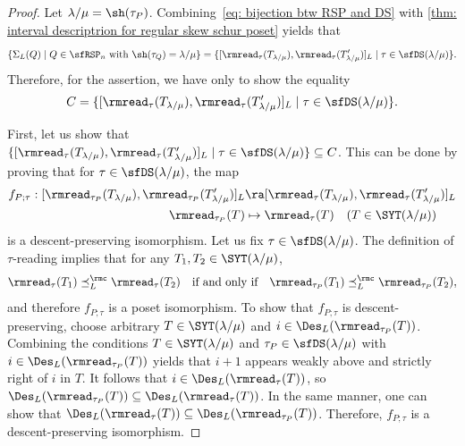 \documentclass[12pt, reqno]{amsart}
\theoremstyle{definition}
\numberwithin{equation}{section} \numberwithin{figure}{section}
\numberwithin{table}{section}
\begin{document}
\begin{proof}
Let $\lambda/\mu = \sh(\tau_P)$.
Combining~\cref{eq: bijection btw RSP and DS} with \cref{thm: interval descriptrion for regular skew schur poset} yields that 
\[
\{\Sigma_L(Q) \mid \text{$Q \in \sfRSP_n$ with $\sh(\tau_Q) = \lambda / \mu$} \} = \{[\rmread_{\tau}(T_{\lambda/\mu}), \rmread_{\tau}(T'_{\lambda/\mu})]_L \mid 
\tau \in \sfDS(\lambda/\mu) \}.
\]
Therefore, for the assertion, we have only to show the equality
\begin{align*}
C = \{[\rmread_{\tau}(T_{\lambda/\mu}), \rmread_{\tau}(T'_{\lambda/\mu})]_L \mid 
\tau \in \sfDS(\lambda/\mu) \}.
\end{align*}

First, let us show that 
$\{[\rmread_{\tau}(T_{\lambda/\mu}), \rmread_{\tau}(T'_{\lambda/\mu})]_L \mid 
\tau \in \sfDS(\lambda/\mu) \} \subseteq C$.
This can be done by proving that for $\tau \in \sfDS(\lambda/\mu)$,
the map 
\begin{align*}
f_{P;\tau}: [\rmread_{\tau_P}(T_{\lambda/\mu}), \rmread_{\tau_P}(T'_{\lambda/\mu})]_L & \ra [\rmread_{\tau}(T_{\lambda/\mu}), \rmread_{\tau}(T'_{\lambda/\mu})]_L
\\ 
\rmread_{\tau_P}(T) &\mapsto \rmread_{\tau}(T)  \quad (T\in \SYT(\lambda / \mu))
\end{align*}
is a descent-preserving isomorphism.
Let us fix $\tau \in \sfDS(\lambda/\mu)$.
The definition of $\tau$-reading implies that 
for any $T_1,T_2 \in \SYT(\lambda/\mu)$, 
$$
\rmread_{\tau}(T_1) \preceq_L^\rmc \rmread_{\tau}(T_2)
\quad \text{if and only if} \quad
\rmread_{\tau_P}(T_1) \preceq_L^\rmc \rmread_{\tau_P}(T_2),
$$
and therefore $f_{P;\tau}$ is a poset isomorphism.
To show that $f_{P;\tau}$ is descent-preserving,   
choose arbitrary $T \in \SYT(\lambda/\mu)$ and $i \in \Des_L(\rmread_{\tau_P}(T))$.
Combining   the conditions $T \in \SYT(\lambda/\mu)$ and $\tau_P \in \sfDS(\lambda /\mu)$ with $i \in \Des_L(\rmread_{\tau_P}(T))$ yields that $i+1$ appears weakly above and strictly right of $i$ in $T$.
It follows that $i \in \Des_L(\rmread_{\tau}(T))$, so $\Des_L(\rmread_{\tau_P}(T)) \subseteq \Des_L(\rmread_{\tau}(T))$.
In the same manner, one can show that $\Des_L(\rmread_{\tau}(T)) \subseteq \Des_L(\rmread_{\tau_P}(T))$.
Therefore, $f_{P;\tau}$ is a descent-preserving isomorphism.



\end{proof}
\end{document}
